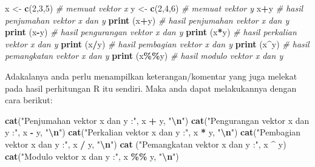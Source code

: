 \documentclass[
]{book}
\newenvironment{Shaded}{\begin{snugshade}}{\end{snugshade}}
\newcommand{\CommentTok}[1]{\textcolor[rgb]{0.56,0.35,0.01}{\textit{#1}}}
\newcommand{\DecValTok}[1]{\textcolor[rgb]{0.00,0.00,0.81}{#1}}
\newcommand{\FunctionTok}[1]{\textcolor[rgb]{0.13,0.29,0.53}{\textbf{#1}}}
\newcommand{\NormalTok}[1]{#1}
\newcommand{\OtherTok}[1]{\textcolor[rgb]{0.56,0.35,0.01}{#1}}
\newcommand{\SpecialCharTok}[1]{\textcolor[rgb]{0.81,0.36,0.00}{\textbf{#1}}}
\newcommand{\StringTok}[1]{\textcolor[rgb]{0.31,0.60,0.02}{#1}}
\begin{document}
\begin{Shaded}
\begin{Highlighting}[]
\NormalTok{x }\OtherTok{\textless{}{-}} \FunctionTok{c}\NormalTok{(}\DecValTok{2}\NormalTok{,}\DecValTok{3}\NormalTok{,}\DecValTok{5}\NormalTok{)    }\CommentTok{\# memuat vektor x}
\NormalTok{y }\OtherTok{\textless{}{-}} \FunctionTok{c}\NormalTok{(}\DecValTok{2}\NormalTok{,}\DecValTok{4}\NormalTok{,}\DecValTok{6}\NormalTok{)    }\CommentTok{\# memuat vektor y}
\NormalTok{x}\SpecialCharTok{+}\NormalTok{y              }\CommentTok{\# hasil penjumahan vektor x dan y}
\FunctionTok{print}\NormalTok{ (x}\SpecialCharTok{+}\NormalTok{y)      }\CommentTok{\# hasil penjumahan vektor x dan y}
\FunctionTok{print}\NormalTok{ (x}\SpecialCharTok{{-}}\NormalTok{y)      }\CommentTok{\# hasil pengurangan vektor x dan y}
\FunctionTok{print}\NormalTok{ (x}\SpecialCharTok{*}\NormalTok{y)      }\CommentTok{\# hasil perkalian vektor x dan y}
\FunctionTok{print}\NormalTok{ (x}\SpecialCharTok{/}\NormalTok{y)      }\CommentTok{\# hasil pembagian vektor x dan y}
\FunctionTok{print}\NormalTok{ (x}\SpecialCharTok{\^{}}\NormalTok{y)      }\CommentTok{\# hasil pemangkatan vektor x dan y}
\FunctionTok{print}\NormalTok{ (x}\SpecialCharTok{\%\%}\NormalTok{y)     }\CommentTok{\# hasil modulo vektor x dan y}
\end{Highlighting}
\end{Shaded}

Adakalanya anda perlu menampilkan keterangan/komentar yang juga melekat pada hasil perhitungan R itu sendiri. Maka anda dapat melakukannya dengan cara berikut:

\begin{Shaded}
\begin{Highlighting}[]
\FunctionTok{cat}\NormalTok{(}\StringTok{"Penjumahan vektor x dan y :"}\NormalTok{, x }\SpecialCharTok{+}\NormalTok{ y, }\StringTok{"}\SpecialCharTok{\textbackslash{}n}\StringTok{"}\NormalTok{)}
\FunctionTok{cat}\NormalTok{(}\StringTok{"Pengurangan vektor x dan y :"}\NormalTok{, x }\SpecialCharTok{{-}}\NormalTok{ y, }\StringTok{"}\SpecialCharTok{\textbackslash{}n}\StringTok{"}\NormalTok{)}
\FunctionTok{cat}\NormalTok{(}\StringTok{"Perkalian vektor x dan y :"}\NormalTok{, x }\SpecialCharTok{*}\NormalTok{ y, }\StringTok{"}\SpecialCharTok{\textbackslash{}n}\StringTok{"}\NormalTok{)}
\FunctionTok{cat}\NormalTok{(}\StringTok{"Pembagian vektor x dan y :"}\NormalTok{, x }\SpecialCharTok{/}\NormalTok{ y, }\StringTok{"}\SpecialCharTok{\textbackslash{}n}\StringTok{"}\NormalTok{)}
\FunctionTok{cat}\NormalTok{ (}\StringTok{"Pemangkatan vektor x dan y :"}\NormalTok{, x }\SpecialCharTok{\^{}}\NormalTok{ y) }
\FunctionTok{cat}\NormalTok{(}\StringTok{"Modulo vektor x dan y :"}\NormalTok{, x }\SpecialCharTok{\%\%}\NormalTok{ y, }\StringTok{"}\SpecialCharTok{\textbackslash{}n}\StringTok{"}\NormalTok{)}
\end{Highlighting}
\end{Shaded}
\end{document}
